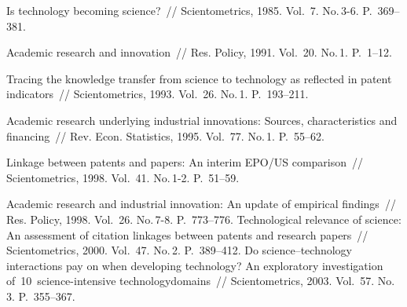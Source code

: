      
   




 \begin{multicols}{2}

\renewcommand{\bibname}{\protect\rmfamily Литература}

{\small\frenchspacing
{%
\begin{thebibliography}{99}

 Is technology becoming science?~// 
Scientometrics, 1985. Vol.~7. No.\,3-6. P.~369--381.

 Academic research and innovation~// 
Res. Policy, 1991. Vol.~20. No.\,1. P.~1--12.

Tracing the knowledge transfer from science to technology as reflected in patent 
indicators~// Scientometrics, 1993. Vol.~26. No.\,1. P.~193--211.

 Academic research underlying industrial innovations: Sources,
 characteristics and financing~// Rev. Econ. Statistics, 1995. Vol.~77. No.\,1. P.~55--62.
 
Linkage between patents and papers: An interim EPO/US comparison~// 
Scientometrics, 1998. Vol.~41. No.\,1-2. P.~51--59.


 Academic research and industrial innovation: An update of empirical 
findings~// Res. Policy, 1998. Vol.~26. No.\,7-8. P.~773--776.
Technological relevance of science: An assessment of citation linkages between 
patents and research papers~// Scientometrics, 2000. Vol.~47. No.\,2. P.~389--412.
Do science--technology interactions pay on when developing technology? 
An exploratory investigation of~10~science-intensive technology\linebreak domains~// 
Scientometrics, 2003. Vol.~57. No.\,3. P.~355--367.
{ %

}
\end{thebibliography}}}
\end{multicols}
